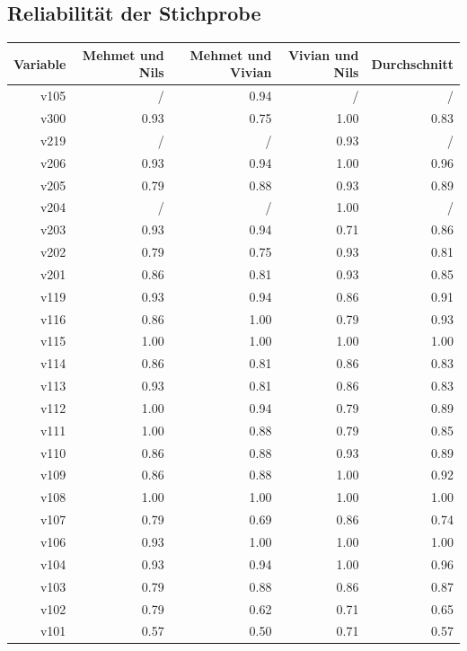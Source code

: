 \subsection{Reliabilität der Stichprobe} 
\begin{table}[ht]
	\centering
	\begin{tabular}{rrrrr}
		\hline
		Variable & Mehmet und Nils & Mehmet und Vivian & Vivian und Nils & Durchschnitt \\ 
		\hline \hline
		v105 & / & 0.94 & / & / \\ 
		v300 & 0.93 & 0.75 & 1.00 & 0.83 \\ 
		v219 & / & / & 0.93 & / \\ 
		v206 & 0.93 & 0.94 & 1.00 & 0.96 \\ 
		v205 & 0.79 & 0.88 & 0.93 & 0.89 \\ 
		v204 & / & / & 1.00 & / \\ 
		v203 & 0.93 & 0.94 & 0.71 & 0.86 \\ 
		v202 & 0.79 & 0.75 & 0.93 & 0.81 \\ 
		v201 & 0.86 & 0.81 & 0.93 & 0.85 \\ 
		v119 & 0.93 & 0.94 & 0.86 & 0.91 \\ 
		v116 & 0.86 & 1.00 & 0.79 & 0.93 \\ 
		v115 & 1.00 & 1.00 & 1.00 & 1.00 \\ 
		v114 & 0.86 & 0.81 & 0.86 & 0.83 \\ 
		v113 & 0.93 & 0.81 & 0.86 & 0.83 \\ 
		v112 & 1.00 & 0.94 & 0.79 & 0.89 \\ 
		v111 & 1.00 & 0.88 & 0.79 & 0.85 \\ 
		v110 & 0.86 & 0.88 & 0.93 & 0.89 \\ 
		v109 & 0.86 & 0.88 & 1.00 & 0.92 \\ 
		v108 & 1.00 & 1.00 & 1.00 & 1.00 \\ 
		v107 & 0.79 & 0.69 & 0.86 & 0.74 \\ 
		v106 & 0.93 & 1.00 & 1.00 & 1.00 \\ 
		v104 & 0.93 & 0.94 & 1.00 & 0.96 \\ 
		v103 & 0.79 & 0.88 & 0.86 & 0.87 \\ 
		v102 & 0.79 & 0.62 & 0.71 & 0.65 \\ 
		v101 & 0.57 & 0.50 & 0.71 & 0.57 \\ 
		\hline
	\end{tabular}
\end{table}




